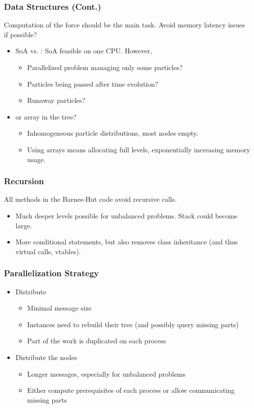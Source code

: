 \begin{frame}
	\frametitle{Data Structures (Cont.)}
	Computation of the force should be the main task. Avoid memory latency issues if possible?
	\begin{itemize}
		\item<1-> SoA vs. : SoA feasible on one CPU. However,
		\begin{itemize}
			\item Parallelized problem managing only some particles?
			\item Particles being passed after time evolution?
			\item Runaway particles?
		\end{itemize}
		\item<2->  or array in the tree?
		\begin{itemize}
			\item Inhomogeneous particle distributions, most nodes empty.
			\item Using arrays means allocating full levels, exponentially increasing memory usage.
		\end{itemize}
	\end{itemize}

\end{frame}

\begin{frame}
	\frametitle{Recursion}
	All methods in the Barnes-Hut code avoid recursive calls.
	\begin{itemize}
		\item Much deeper levels possible for unbalanced problems. Stack could become large.
		\item More conditional statements, but also removes class inheritance (and thus virtual calls, vtables).
	\end{itemize}
\end{frame}

\begin{frame}
	\frametitle{Parallelization Strategy}
	\begin{itemize}
		\item Distribute \only<2>{\alert{only particles}}
		\begin{itemize}
			\item Minimal message size
			\item Instances need to rebuild their tree (and possibly query missing parts)
			\item Part of the work is duplicated on each process
		\end{itemize}
		\item Distribute the nodes
		\begin{itemize}
			\item Longer messages, especially for unbalanced problems
			\item Either compute prerequisites of each process or allow communicating missing parts
		\end{itemize}
	\end{itemize}
\end{frame}

